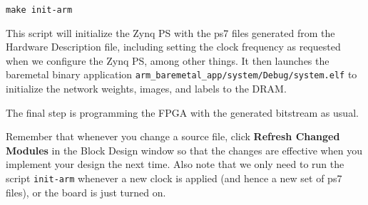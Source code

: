 \documentclass[11pt]{article}
\begin{document}
\texttt{make init-arm}

This script will initialize the Zynq PS with the ps7 files generated from the Hardware Description file, including setting the clock frequency as requested when we configure the Zynq PS, among other things. It then launches the baremetal binary application \verb|arm_baremetal_app/system/Debug/system.elf| to initialize the network weights, images, and labels to the DRAM.

The final step is programming the FPGA with the generated bitstream as usual.

Remember that whenever you change a source file, click \textbf{Refresh Changed Modules} in the Block Design window so that the changes are effective when you implement your design the next time. Also note that we only need to run the script \verb|init-arm| whenever a new clock is applied (and hence a new set of ps7 files), or the board is just turned on.
\end{document}
